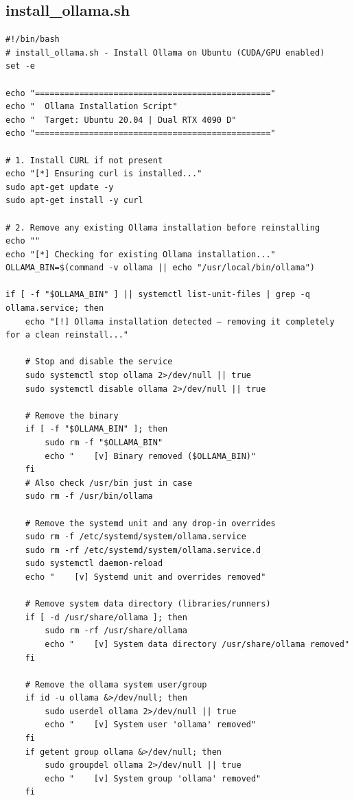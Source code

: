 \documentclass[11pt]{article}
\begin{document}
\subsection{install\_ollama.sh}
\begin{lstlisting}[style=bashstyle, caption={install\_ollama.sh}]
#!/bin/bash
# install_ollama.sh - Install Ollama on Ubuntu (CUDA/GPU enabled)
set -e

echo "================================================"
echo "  Ollama Installation Script"
echo "  Target: Ubuntu 20.04 | Dual RTX 4090 D"
echo "================================================"

# 1. Install CURL if not present
echo "[*] Ensuring curl is installed..."
sudo apt-get update -y
sudo apt-get install -y curl

# 2. Remove any existing Ollama installation before reinstalling
echo ""
echo "[*] Checking for existing Ollama installation..."
OLLAMA_BIN=$(command -v ollama || echo "/usr/local/bin/ollama")

if [ -f "$OLLAMA_BIN" ] || systemctl list-unit-files | grep -q ollama.service; then
    echo "[!] Ollama installation detected — removing it completely for a clean reinstall..."

    # Stop and disable the service
    sudo systemctl stop ollama 2>/dev/null || true
    sudo systemctl disable ollama 2>/dev/null || true

    # Remove the binary
    if [ -f "$OLLAMA_BIN" ]; then
        sudo rm -f "$OLLAMA_BIN"
        echo "    [v] Binary removed ($OLLAMA_BIN)"
    fi
    # Also check /usr/bin just in case
    sudo rm -f /usr/bin/ollama

    # Remove the systemd unit and any drop-in overrides
    sudo rm -f /etc/systemd/system/ollama.service
    sudo rm -rf /etc/systemd/system/ollama.service.d
    sudo systemctl daemon-reload
    echo "    [v] Systemd unit and overrides removed"

    # Remove system data directory (libraries/runners)
    if [ -d /usr/share/ollama ]; then
        sudo rm -rf /usr/share/ollama
        echo "    [v] System data directory /usr/share/ollama removed"
    fi

    # Remove the ollama system user/group
    if id -u ollama &>/dev/null; then
        sudo userdel ollama 2>/dev/null || true
        echo "    [v] System user 'ollama' removed"
    fi
    if getent group ollama &>/dev/null; then
        sudo groupdel ollama 2>/dev/null || true
        echo "    [v] System group 'ollama' removed"
    fi


\end{lstlisting}
\end{document}
